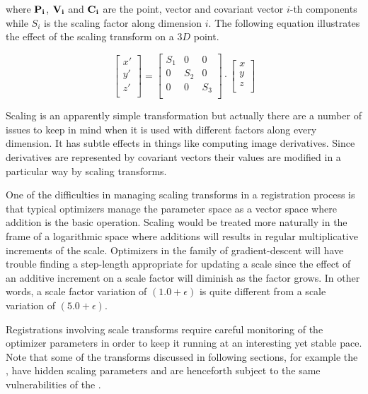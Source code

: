 where $\bf{P}_i$, $\bf{V}_i$ and $\bf{C}_i$ are the point, vector and covariant
vector $i$-th components while $S_i$ is the scaling factor along dimension $i$.
The following equation illustrates the effect of the scaling transform on a
$3D$ point.

\begin{equation}
\left[ 
\begin{array}{c}
x' \\
y' \\
z' \\
\end{array}
\right]
=
\left[ 
\begin{array}{ccc}
S_1 &  0  &  0  \\
 0  & S_2 &  0  \\
 0  &  0  & S_3 \\
\end{array}
\right]
\cdot
\left[ 
\begin{array}{c}
x  \\
y  \\
z  \\
\end{array}
\right]
\end{equation}


Scaling is an apparently simple transformation but actually there are a number of
issues to keep in mind when it is used with different factors
along every dimension. It has subtle effects in things like computing image
derivatives. Since derivatives are represented by covariant vectors their
values are modified in a particular way by scaling transforms.

One of the difficulties in managing scaling transforms in a registration
process is that typical optimizers manage the parameter space as a vector space
where addition is the basic operation. Scaling would be treated more
naturally in the frame of a logarithmic space where additions will results in
regular multiplicative increments of the scale. Optimizers in the family of
gradient-descent will have trouble finding a step-length appropriate for
updating a scale since the effect of an additive increment on a scale factor
will diminish as the factor grows. In other words, a scale factor variation of
$(1.0+ \epsilon)$ is quite different from a scale variation of $(5.0+\epsilon)$.

Registrations involving scale transforms require careful monitoring of the
optimizer parameters in order to keep it running at an interesting yet stable
pace. Note that some of the transforms discussed in following sections, for
example the , have hidden scaling parameters and are henceforth
subject to the same vulnerabilities of the .

